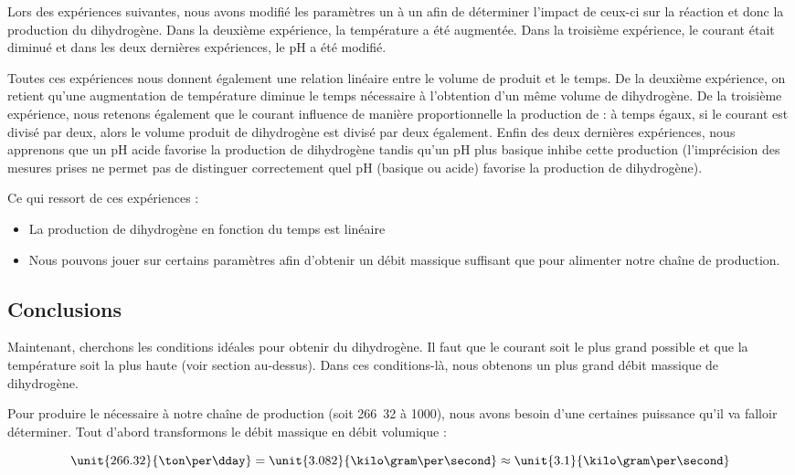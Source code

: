 Lors des expériences suivantes, nous avons modifié les paramètres un à
un afin de déterminer l'impact de ceux-ci sur la réaction et donc la
production du dihydrogène. Dans la deuxième expérience, la température
a été augmentée. Dans la troisième expérience, le courant était diminué
et dans les deux dernières expériences, le pH a été modifié.

Toutes ces expériences nous donnent également une relation linéaire
entre le volume de  produit et le temps. De la deuxième expérience,
on retient qu'une augmentation de température diminue le temps nécessaire
à l'obtention d'un même volume de dihydrogène. De la troisième expérience,
nous retenons également que le courant influence de manière proportionnelle
la production de  : à temps égaux, si le courant est divisé par deux,
alors le volume produit de dihydrogène est divisé par deux également. Enfin
des deux dernières expériences, nous apprenons que un pH acide favorise la
production de dihydrogène tandis qu'un pH plus basique inhibe cette
production (l'imprécision des mesures prises ne permet pas de distinguer
correctement quel pH (basique ou acide) favorise la production de dihydrogène).

Ce qui ressort de ces expériences :

\begin{itemize}
	\item La production de dihydrogène en fonction du temps est linéaire
	\item Nous pouvons jouer sur certains paramètres afin d'obtenir un débit
	massique suffisant que pour alimenter notre chaîne de production.
\end{itemize}

\subsection{Conclusions}
Maintenant, cherchons les conditions idéales pour obtenir du dihydrogène.
Il faut que le courant soit le plus grand possible et que la température
soit la plus haute (voir section au-dessus). Dans ces conditions-là, nous
obtenons un plus grand débit massique de dihydrogène.

Pour produire le  nécessaire à notre chaîne de production
(soit \unit{266.32}{\ton\per\dday} à \unit{1000}{\kelvin}), nous avons besoin d'une
certaines puissance qu'il va falloir déterminer. Tout d'abord transformons
le débit massique en débit volumique :

$$\unit{266.32}{\ton\per\dday} = \unit{3.082}{\kilo\gram\per\second} \approx \unit{3.1}{\kilo\gram\per\second}$$

